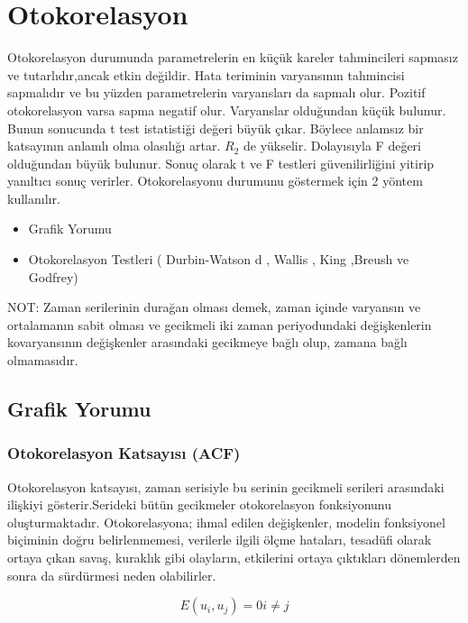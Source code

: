\documentclass[11pt]{article}
\providecommand{\tightlist}{%
      \setlength{\itemsep}{0pt}\setlength{\parskip}{0pt}}
\begin{document}
    \section{Otokorelasyon}\label{otokorelasyon}

Otokorelasyon durumunda parametrelerin en küçük kareler tahmincileri
sapmasız ve tutarlıdır,ancak etkin değildir. Hata teriminin varyansının
tahmincisi sapmalıdır ve bu yüzden parametrelerin varyansları da sapmalı
olur. Pozitif otokorelasyon varsa sapma negatif olur. Varyanslar
olduğundan küçük bulunur. Bunun sonucunda t test istatistiği değeri
büyük çıkar. Böylece anlamsız bir katsayının anlamlı olma olasılığı
artar. \(R_{2}\) de yükselir. Dolayısıyla F değeri olduğundan büyük
bulunur. Sonuç olarak t ve F testleri güvenilirliğini yitirip yanıltıcı
sonuç verirler. Otokorelasyonu durumunu göstermek için 2 yöntem
kullanılır.

\begin{itemize}
\tightlist
\item
  Grafik Yorumu
\item
  Otokorelasyon Testleri ( Durbin-Watson d , Wallis , King ,Breush ve
  Godfrey)
\end{itemize}

NOT: Zaman serilerinin durağan olması demek, zaman içinde varyansın ve
ortalamanın sabit olması ve gecikmeli iki zaman periyodundaki
değişkenlerin kovaryansının değişkenler arasındaki gecikmeye bağlı olup,
zamana bağlı olmamasıdır.

\subsection{Grafik Yorumu}\label{grafik-yorumu}

\subsubsection{Otokorelasyon Katsayısı
(ACF)}\label{otokorelasyon-katsayux131sux131-acf}

Otokorelasyon katsayısı, zaman serisiyle bu serinin gecikmeli serileri
arasındaki ilişkiyi gösterir.Serideki bütün gecikmeler otokorelasyon
fonksiyonunu oluşturmaktadır. Otokorelasyona; ihmal edilen değişkenler,
modelin fonksiyonel biçiminin doğru belirlenmemesi, verilerle ilgili
ölçme hataları, tesadüfi olarak ortaya çıkan savaş, kuraklık gibi
olayların, etkilerini ortaya çıktıkları dönemlerden sonra da sürdürmesi
neden olabilirler.

\[ E(u_{i},u_{j})=0 i≠j \]
\end{document}
